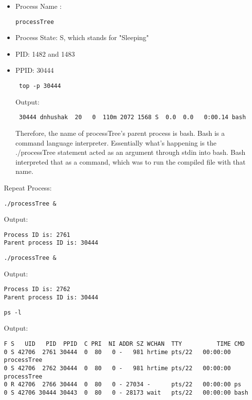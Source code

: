 \documentclass[11pt]{report}
\begin{document}
\begin{itemize}
\item Process Name :\begin{verbatim}processTree\end{verbatim}

\item Process State: S, which stands for "Sleeping"

\item PID: 1482 and 1483

\item PPID: 30444

\begin{verbatim} top -p 30444 \end{verbatim}

Output:
\begin{verbatim} 30444 dnhushak  20   0  110m 2072 1568 S  0.0  0.0   0:00.14 bash  \end{verbatim}

Therefore, the name of processTree's parent process is bash. Bash is a command language interpreter. Essentially what's happening is the ./processTree statement acted as an argument through stdin into bash. Bash interpreted that as a command, which was to run the compiled file with that name.

\end{itemize}

Repeat Process:

\begin{verbatim}
./processTree &
\end{verbatim}

Output:
\begin{verbatim}
Process ID is: 2761
Parent process ID is: 30444
\end{verbatim}

\begin{verbatim}
./processTree &
\end{verbatim}

Output:
\begin{verbatim}
Process ID is: 2762
Parent process ID is: 30444
\end{verbatim}

\begin{verbatim}
ps -l
\end{verbatim}

Output:

\begin{verbatim}
F S   UID   PID  PPID  C PRI  NI ADDR SZ WCHAN  TTY          TIME CMD
0 S 42706  2761 30444  0  80   0 -   981 hrtime pts/22   00:00:00 processTree
0 S 42706  2762 30444  0  80   0 -   981 hrtime pts/22   00:00:00 processTree
0 R 42706  2766 30444  0  80   0 - 27034 -      pts/22   00:00:00 ps
0 S 42706 30444 30443  0  80   0 - 28173 wait   pts/22   00:00:00 bash
\end{verbatim}
\pagebreak
\end{document}
